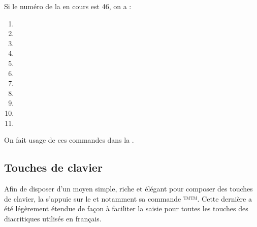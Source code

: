 \documentclass{letgut}
\begin{document}
\begin{ltx-code-result}[title addon=emplois des commandes \refCom{lettre} et \refCom{lettregut},listing options app={deletekeywords={[6]{cours,lettre}}}]
Si le numéro de la  en cours est 46, on a :
\begin{enumerate}
\item {}
\item {}
\item {}
\item {}
\item {}
\item {}
\item {}
\item {}
\item {}
\item {}
\item {}
\end{enumerate}
On fait usage de ces commandes dans la .
\end{ltx-code-result}

\subsection{Touches de clavier}
\label{sec:touches-de-clavier}

Afin de disposer d'un moyen simple, riche et élégant pour composer des touches
de clavier, la  s'appuie sur le  et notamment sa
commande ™\LKey™. Cette dernière a été légèrement étendue de façon à faciliter
la saisie pour toutes les touches des diacritiques utilisés en français.

\begin{ltx-code-result}[title addon=touches de clavier]
   

 

\LKeyCtrl \LKeyAlt \LKeyAltGr \LKeyShift \LKeyEnter \LKeyTab

   

\LKeyAt \LKeyScreenUp \LKeyScreenDown \LKeyCommand \LKeyOptionKey

\LMouseN \LMouseL \LMouseM \LMouseR

   

     
     
   
 
     
   
\end{ltx-code-result}
\end{document}
